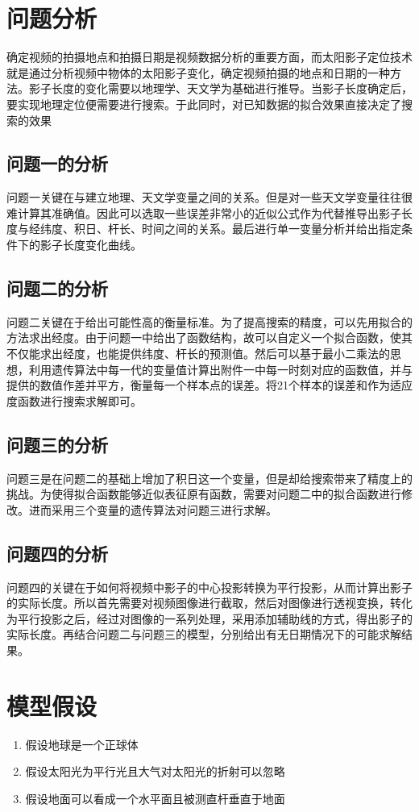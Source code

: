 \documentclass[12pt]{cumcmart}   %
\begin{document}
\newpage

\section{问题分析}
确定视频的拍摄地点和拍摄日期是视频数据分析的重要方面，而太阳影子定位技术就是通过分析视频中物体的太阳影子变化，确定视频拍摄的地点和日期的一种方法。影子长度的变化需要以地理学、天文学为基础进行推导。当影子长度确定后，要实现地理定位便需要进行搜索。于此同时，对已知数据的拟合效果直接决定了搜索的效果
\subsection{问题一的分析}
问题一关键在与建立地理、天文学变量之间的关系。但是对一些天文学变量往往很难计算其准确值。因此可以选取一些误差非常小的近似公式作为代替推导出影子长度与经纬度、积日、杆长、时间之间的关系。最后进行单一变量分析并给出指定条件下的影子长度变化曲线。
\subsection{问题二的分析}
问题二关键在于给出可能性高的衡量标准。为了提高搜索的精度，可以先用拟合的方法求出经度。由于问题一中给出了函数结构，故可以自定义一个拟合函数，使其不仅能求出经度，也能提供纬度、杆长的预测值。然后可以基于最小二乘法的思想，利用遗传算法中每一代的变量值计算出附件一中每一时刻对应的函数值，并与提供的数值作差并平方，衡量每一个样本点的误差。将21个样本的误差和作为适应度函数进行搜索求解即可。
\subsection{问题三的分析}
问题三是在问题二的基础上增加了积日这一个变量，但是却给搜索带来了精度上的挑战。为使得拟合函数能够近似表征原有函数，需要对问题二中的拟合函数进行修改。进而采用三个变量的遗传算法对问题三进行求解。
\subsection{问题四的分析}
问题四的关键在于如何将视频中影子的中心投影转换为平行投影，从而计算出影子的实际长度。所以首先需要对视频图像进行截取，然后对图像进行透视变换，转化为平行投影之后，经过对图像的一系列处理，采用添加辅助线的方式，得出影子的实际长度。再结合问题二与问题三的模型，分别给出有无日期情况下的可能求解结果。

\newpage

\section{模型假设}
\begin{center}
\begin{enumerate}
\item 假设地球是一个正球体
\item 假设太阳光为平行光且大气对太阳光的折射可以忽略
\item 假设地面可以看成一个水平面且被测直杆垂直于地面
\end{enumerate}
\end{center}
\end{document}
